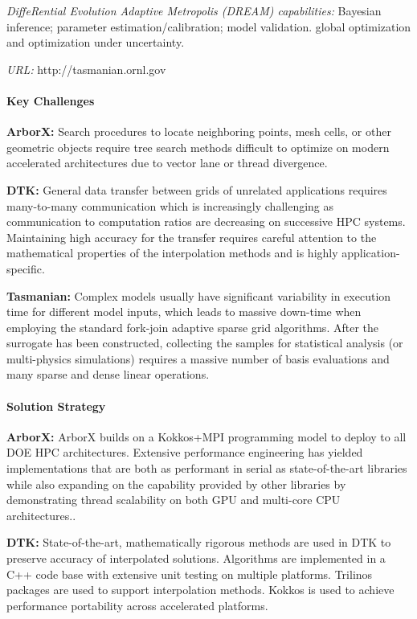 {\it DiffeRential Evolution Adaptive Metropolis (DREAM) capabilities:}
Bayesian inference; parameter estimation/calibration; model validation.
global optimization and optimization under uncertainty.

{\it URL:} http://tasmanian.ornl.gov

\paragraph{Key Challenges}

\indent

{\bf ArborX:} Search procedures to locate neighboring points, mesh cells, or
other geometric objects require tree search methods difficult to optimize on
modern accelerated architectures due to vector lane or thread divergence.

{\bf DTK:} General data transfer between grids of unrelated applications
requires many-to-many communication which is increasingly challenging as
communication to computation ratios are decreasing on successive HPC systems.
Maintaining high accuracy for the transfer requires careful attention to the
mathematical properties of the interpolation methods and is highly
application-specific.

{\bf Tasmanian:} Complex models usually have significant variability in
execution time for different model inputs, which leads to massive down-time
when employing the standard fork-join adaptive sparse grid algorithms.  After
the surrogate has been constructed, collecting the samples for statistical
analysis (or multi-physics simulations) requires a massive number of basis
evaluations and many sparse and dense linear operations.

\paragraph{Solution Strategy}

\nobreak


\indent

{\bf ArborX:} ArborX builds on a Kokkos+MPI programming model to deploy to all
DOE HPC architectures. Extensive performance engineering has yielded
implementations that are both as performant in serial as state-of-the-art
libraries while also expanding on the capability provided by other libraries
by demonstrating thread scalability on both GPU and multi-core CPU
architectures..

{\bf DTK:} State-of-the-art, mathematically rigorous methods are used in DTK
to preserve accuracy of interpolated solutions.  Algorithms are implemented in
a C++ code base with extensive unit testing on multiple platforms.  Trilinos
packages are used to support interpolation methods.  Kokkos is used to achieve
performance portability across accelerated platforms.

